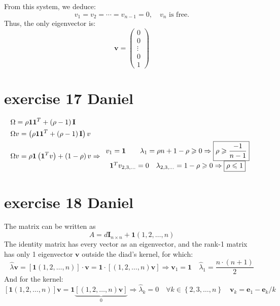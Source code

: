 \documentclass{article}
\begin{document}
From this system, we deduce:
\[
    v_1 = v_2 = \cdots = v_{n-1} = 0, \quad v_n \text{ is free.}
\]
Thus, the only eigenvector is:
\[
    \mathbf{v} = \begin{pmatrix}
        0      \\
        0      \\
        \vdots \\
        0      \\
        1
    \end{pmatrix}
\]

\section{exercise 17 Daniel}
\[\begin{gathered}
        \Omega  = \rho {\mathbf{1}}{{\mathbf{1}}^T} + \left( {\rho  - 1} \right){\mathbf{I}} \hfill \\
        \Omega v = \left( {\rho {\mathbf{1}}{{\mathbf{1}}^T} + \left( {\rho  - 1} \right){\mathbf{I}}} \right)v \hfill \\
        \Omega v = \rho {\mathbf{1}}\left( {{{\mathbf{1}}^T}v} \right) + \left( {1 - \rho } \right)v \Rightarrow \begin{array}{*{20}{c}}
            {{v_1} = {\mathbf{1}}\qquad {\lambda _1} = \rho n + 1 - \rho  \geqslant 0 \Rightarrow \boxed{\rho  \geqslant \frac{{ - 1}}{{n - 1}}}} \\
            {{\mathbf{1}^T}{v_{2,3, \ldots }} = 0\quad {\lambda _{2,3, \ldots }} = 1 - \rho  \geqslant 0 \Rightarrow \boxed{\rho  \leqslant 1}}
        \end{array} \hfill \\
    \end{gathered} \]

\section{exercise 18 Daniel}
The matrix can be written as
\[A= d{{\mathbf{I}}_{n \times n}} + {\mathbf{1}} \left( {1,2, \ldots ,n} \right)\]
The identity matrix has every vector as an eigenvector, and the rank-1 matrix has only 1 eigenvector $\mathbf{v}$ outside the diad's kernel, for which:
\[
    \hat\lambda \mathbf{v} = \left[{\mathbf{1}} \left( {1,2, \ldots ,n} \right) \right] \cdot \mathbf{v} = {\mathbf{1}} \cdot \left[ \left( {1,2, \ldots ,n} \right) \mathbf{v}\right] \Rightarrow \mathbf{v}_1 = \mathbf{1} \quad \hat\lambda_1 = \frac{n \cdot (n+1)}{2}
\]
And for the kernel:
\[\left[ {{\mathbf{1}}\left( {1,2, \ldots ,n} \right)} \right]{\mathbf{v}} = {\mathbf{1}}\underbrace {\left[ {\left( {1,2, \ldots ,n} \right){\mathbf{v}}} \right]}_0 \Rightarrow \hat\lambda _k = 0\quad \forall k \in \left\{ {2,3, \ldots ,n} \right\}\quad {{\mathbf{v}}_k} = {{\mathbf{e}}_1} - {{\mathbf{e}}_k}/k\]
\end{document}
